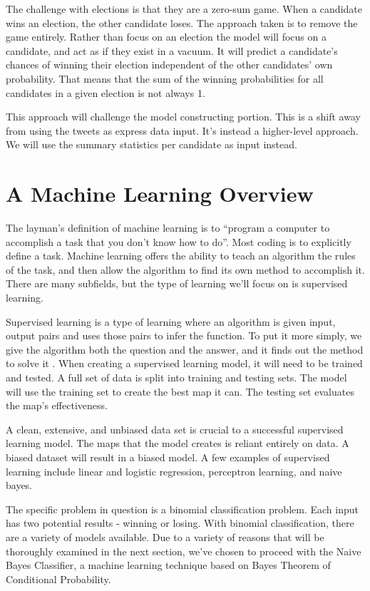 \documentclass[11pt, twoside, reqno]{book}
\begin{document}
The challenge with elections is that they are a zero-sum game. When a candidate wins an election, the other candidate loses. The approach taken is to remove the game entirely. Rather than focus on an election the model will focus on a candidate, and act as if they exist in a vacuum. It will predict a candidate's chances of winning their election independent of the other candidates' own probability. That means that the sum of the winning probabilities for all candidates in a given election is not always 1.

This approach will challenge the model constructing portion. This is a shift away from using the tweets as express data input. It's instead a higher-level approach. We will use the summary statistics per candidate as input instead. 

\section{A Machine Learning Overview}
\hspace{0.2in} The layman's definition of machine learning is to ``program a computer to accomplish a task that you don't know how to do''. Most coding is to explicitly define a task. Machine learning offers the ability to teach an algorithm the rules of the task, and then allow the algorithm to find its own method to accomplish it. There are many subfields, but the type of learning we'll focus on is supervised learning. 

Supervised learning is a type of learning where an algorithm is given input, output pairs and uses those pairs to infer the function. To put it more simply, we give the algorithm both the question and the answer, and it finds out the method to solve it \cite{ng2000cs229}. When creating a supervised learning model, it will need to be trained and tested. A full set of data is split into training and testing sets. The model will use the training set to create the best map it can. The testing set evaluates the map's effectiveness. 

A clean, extensive, and unbiased data set is crucial to a successful supervised learning model. The maps that the model creates is reliant entirely on data. A biased dataset will result in a biased model. A few examples of supervised learning include linear and logistic regression, perceptron learning, and naive bayes. 

The specific problem in question is a binomial classification problem. Each input has two potential results - winning or losing. With binomial classification, there are a variety of models available. Due to a variety of reasons that will be thoroughly examined in the next section, we've chosen to proceed with the Naive Bayes Classifier, a machine learning technique based on Bayes Theorem of Conditional Probability. 
\end{document}
